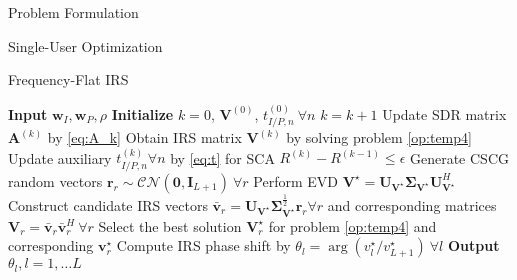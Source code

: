 \documentclass{IEEEtran}
\begin{document}
\begin{section}{Problem Formulation}
\begin{subsection}{Single-User Optimization}
\begin{subsubsection}{Frequency-Flat IRS}
			\begin{algorithm}
				\caption{IRS Optimization}
				\label{alg:irs}
				\begin{algorithmic}[1]
					\State \textbf{Input} $\boldsymbol{w}_I,\boldsymbol{w}_P,\rho$
					\State \textbf{Initialize} $k=0$, $\boldsymbol{V}^{(0)}$, $t_{I/P,n}^{(0)} \ \forall n$
					\Repeat
					\State $k = k + 1$
					\State Update SDR matrix $\boldsymbol{A}^{(k)}$ by \ref{eq:A_k}
					\State Obtain IRS matrix $\boldsymbol{V}^{(k)}$ by solving problem \ref{op:temp4}
					\State Update auxiliary $t_{I/P,n}^{(k)} \forall n$ by \ref{eq:t} for SCA
					\Until $R^{(k)}-R^{(k-1)} \le \epsilon$
					\State Generate CSCG random vectors $\boldsymbol{r}_r \sim \mathcal{CN}(\boldsymbol{0},\boldsymbol{I}_{L+1}) \ \forall r$
					\State Perform EVD $\boldsymbol{V}^{\star}=\boldsymbol{U}_{\boldsymbol{V}^{\star}}\boldsymbol{\Sigma}_{\boldsymbol{V}^{\star}}\boldsymbol{U}_{\boldsymbol{V}^{\star}}^H$
					\State Construct candidate IRS vectors $\bar{\boldsymbol{v}}_r=\boldsymbol{U}_{\boldsymbol{V}^{\star}}\boldsymbol{\Sigma}_{\boldsymbol{V}^{\star}}^{\frac{1}{2}}\boldsymbol{r}_r \forall r$ and corresponding matrices $\boldsymbol{V}_r=\bar{\boldsymbol{v}}_r\bar{\boldsymbol{v}}_r^H  \ \forall r$
					\State Select the best solution $\boldsymbol{V}_r^\star$ for problem \ref{op:temp4} and corresponding $\boldsymbol{v}_r^\star$
					\State Compute IRS phase shift by $\theta_l=\arg(v_l^\star/v_{L+1}^\star) \ \forall l$
					\State \textbf{Output} $\theta_l, l = 1 , \dots L$
				\end{algorithmic}
			\end{algorithm}


\end{subsubsection}
\end{subsection}
\end{section}
\end{document}
